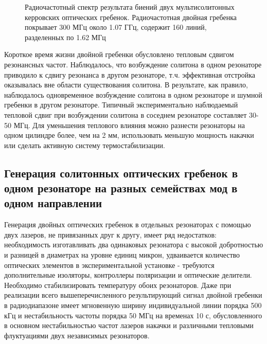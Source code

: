 \begin{figure}[ht]
\begin{minipage}[ht]{1\linewidth}
\end{minipage}
\caption{Радиочастотный спектр результата биений двух мультисолитонных керровских оптических гребенок. Радиочастотная двойная гребенка покрывает 300 МГц около 1.07 ГГц, содержит 160 линий, разделенных по 1.62 МГц}
\label{ris:image4}
\end{figure}

Короткое время жизни двойной гребенки обусловлено тепловым сдвигом резонансных частот. Наблюдалось, что возбуждение солитона в одном резонаторе приводило к сдвигу резонанса в другом резонаторе, т.ч. эффективная отстройка оказывалась вне области существования солитона. В результате, как правило, наблюдалось одновременное возбуждение солитона в одном резонаторе и шумной гребенки в другом резонаторе. Типичный экспериментально наблюдаемый тепловой сдвиг при возбуждении солитона в соседнем резонаторе составляет 30-50 МГц. Для уменьшения теплового влияния можно разнести резонаторы на одном цилиндре более, чем на 2 мм, использовать меньшую мощность накачки или сделать активную систему термостабилизации.


\subsection{Генерация солитонных оптических гребенок в одном резонаторе на разных семействах мод в одном направлении}

Генерация двойных оптических гребенок в отдельных резонаторах с помощью двух лазеров, не привязанных друг к другу, имеет ряд недостатков: необходимость изготавливать два одинаковых резонатора с высокой добротностью и разницей в диаметрах на уровне единиц микрон, удваивается количество оптических элементов в экспериментальной установке - требуются дополнительные изоляторы, контроллеры поляризации и оптические делители. Необходимо стабилизировать температуру обоих резонаторов. Даже при реализации всего вышеперечисленного результирующий сигнал двойной гребенки в радиодиапазоне имеет мгновенную ширину индивидуальной линии порядка 500 кГц и нестабильность частоты порядка 50 МГц на временах 10 с, обусловленного в основном нестабильностью частот лазеров накачки и различными тепловыми флуктуациями двух независимых резонаторов.

